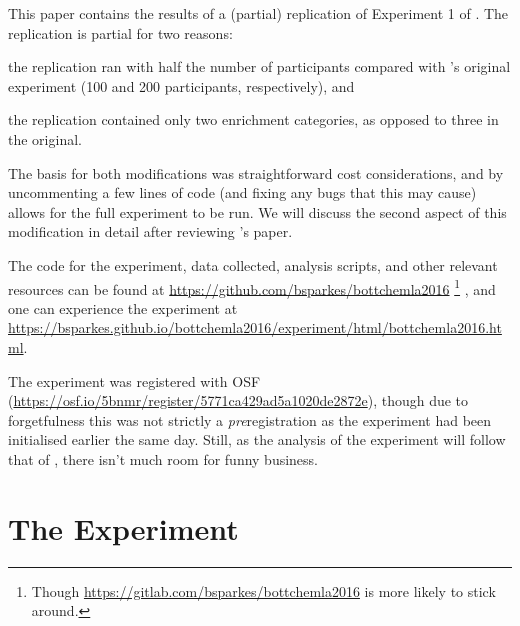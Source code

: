 \documentclass[10pt]{article}
\begin{document}
\begin{multicols}{2}
This paper contains the results of a (partial) replication of Experiment 1 of \textcite{Bott:2016aa}.
The replication is partial for two reasons:
\begin{enumerate*}[label=\arabic*)]
\item the replication ran with half the number of participants compared with \citeauthor{Bott:2016aa}'s original experiment (100 and 200 participants, respectively), and
\item the replication contained only two enrichment categories, as opposed to three in the original.
\end{enumerate*}
The basis for both modifications was straightforward cost considerations, and by uncommenting a few lines of code (and fixing any bugs that this may cause) allows for the full experiment to be run.
We will discuss the second aspect of this modification in detail after reviewing \citeauthor{Bott:2016aa}'s paper.

The code for the experiment, data collected, analysis scripts, and other relevant resources can be found at \url{https://github.com/bsparkes/bottchemla2016}\nolinebreak
\footnote{Though \url{https://gitlab.com/bsparkes/bottchemla2016} is more likely to stick around.}\nolinebreak
, and one can experience the experiment at \url{https://bsparkes.github.io/bottchemla2016/experiment/html/bottchemla2016.html}.

The experiment was registered with OSF (\url{https://osf.io/5bnmr/register/5771ca429ad5a1020de2872e}), though due to forgetfulness this was not strictly a \emph{pre}registration as the experiment had been initialised earlier the same day.
Still, as the analysis of the experiment will follow that of \citeauthor{Bott:2016aa}, there isn't much room for funny business.





\section{The Experiment}
\label{sec:experiment}


\end{multicols}
\end{document}
